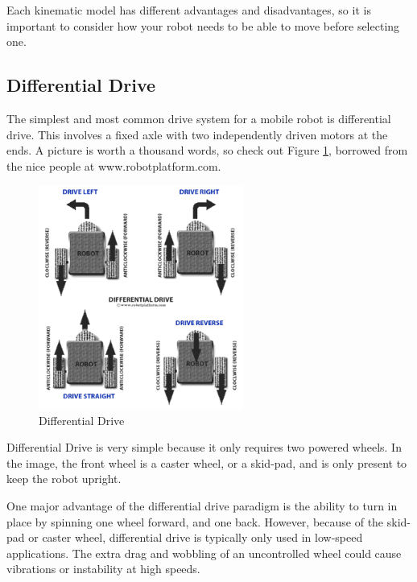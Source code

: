 Each kinematic model has different advantages and disadvantages, so it is important to consider how your robot needs to be able to move before selecting one.

\subsection{Differential Drive}

The simplest and most common drive system for a mobile robot is differential drive. This involves a fixed axle with two independently driven motors at the ends. A picture is worth a thousand words, so check out Figure \ref{fig:diffdrive}, borrowed from the nice people at www.robotplatform.com.

\begin{figure}[h]
\centering
\includegraphics[width=0.6\textwidth]{Differential_Drive.png}
\caption{Differential Drive}
\label{fig:diffdrive}
\end{figure}

Differential Drive is very simple because it only requires two powered wheels. In the image, the front wheel is a caster wheel, or a skid-pad, and is only present to keep the robot upright.

One major advantage of the differential drive paradigm is the ability to turn in place by spinning one wheel forward, and one back. However, because of the skid-pad or caster wheel, differential drive is typically only used in low-speed applications. The extra drag and wobbling of an uncontrolled wheel could cause vibrations or instability at high speeds.



